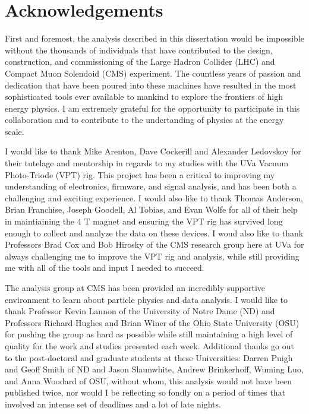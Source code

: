 \chapter{Acknowledgements}
\label{acknowledgements_overview}

\par First and foremost, the analysis described in this dissertation
would be impossible without the thousands of individuals that have
contributed to the design, construction, and commissioning of the
Large Hadron Collider (LHC) and Compact Muon Solendoid (CMS)
experiment.  The countless years of passion and dedication that have
been poured into these machines have resulted in the most
sophisticated tools ever available to mankind to explore the frontiers
of high energy physics.  I am extremely grateful for the opportunity
to participate in this collaboration and to contribute to the
undertanding of physics at the \TeV energy scale.  

\par I would like to thank Mike Arenton, Dave Cockerill and Alexander
Ledovskoy for their tutelage and mentorship in regards to my studies
with the UVa Vacuum Photo-Triode (VPT) rig.  This project has been a
critical to improving my understanding of electronics, firmware, and
signal analysis, and has been both a challenging and exciting
experience.  I would also like to thank Thomas Anderson, Brian
Franchise, Joseph Goodell, Al Tobias, and Evan Wolfe for all of their help in
maintiaining the 4 T magnet and ensuring the VPT rig has survived long
enough to collect and analyze the data on these devices.  I woud also
like to thank Professors Brad Cox and Bob Hirosky of the CMS research
group here at UVa for always challenging me to improve the VPT rig and
analysis, while still providing me with all of the tools and input I
needed to succeed.   

\par The \ttH analysis group at CMS has been provided an incredibly
supportive environment to learn about particle physics and data
analysis.  I would like to thank Professor Kevin Lannon of the
University of Notre Dame (ND) and Professors Richard Hughes and Brian
Winer of the Ohio State University (OSU) for pushing the group as hard
as possible while still maintaining a high level of quality for the
work and studies presented each week. Additional thanks go out to the
post-doctoral and graduate students at these Universities: Darren
Puigh and Geoff Smith of ND and Jason Slaunwhite, Andrew Brinkerhoff,
Wuming Luo, and Anna Woodard of OSU, without whom, this analysis would
not have been published twice, nor would I be reflecting so fondly on
a period of times that involved an intense set of deadlines and a lot
of late nights.  

